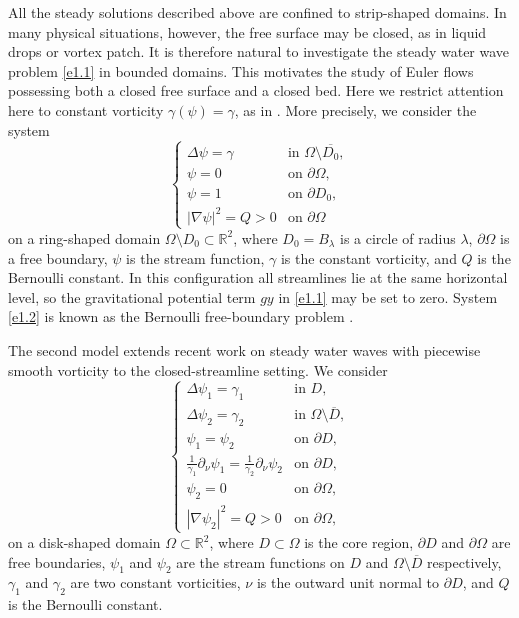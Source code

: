 \documentclass[reqno]{amsart}
\numberwithin{equation}{section}
\numberwithin{equation}{section}
\numberwithin{equation}{section}
\begin{document}
All the steady solutions described above are confined to strip-shaped domains. In many physical situations, however, the free surface may be closed, as in liquid drops or vortex patch. It is therefore natural to investigate the steady water wave problem \eqref{e1.1} in bounded domains. This motivates the study of Euler flows possessing both a closed free surface and a closed bed. Here we restrict attention here to constant vorticity \(\gamma(\psi) = \gamma\), as in \cite{ConstantinSV,ConstantinV}. More precisely, we consider the system
\begin{equation}
\label{e1.2}
\begin{cases}
\Delta \psi = \gamma & \text{in } \Omega \setminus \overline{D_0}, \\
\psi = 0 & \text{on } \partial \Omega, \\
\psi = 1 & \text{on } \partial D_0, \\
|\nabla \psi|^2 = Q > 0 & \text{on } \partial \Omega
\end{cases}
\end{equation}
on a ring-shaped domain \(\Omega \setminus D_0 \subset \mathbb{R}^2\), where \(D_0 = B_\lambda\) is a circle of radius \(\lambda\), \(\partial \Omega\) is a free boundary, \(\psi\) is the stream function, \(\gamma\) is the constant vorticity, and \(Q\) is the Bernoulli constant. In this configuration all streamlines lie at the same horizontal level, so the gravitational potential term \(gy\) in \eqref{e1.1} may be set to zero. System \eqref{e1.2} is known as the Bernoulli free-boundary problem \cite[(1.1)]{HenrotO}.

The second model extends recent work \cite{GuiWYZ} on steady water waves with piecewise smooth vorticity to the closed-streamline setting. We consider
\begin{equation}\label{e1.3}
\begin{cases}
\Delta \psi_1 = \gamma_1 & \text{in } D, \\
\Delta \psi_2 = \gamma_2 & \text{in } \Omega \setminus \overline{D}, \\
\psi_1 = \psi_2 & \text{on } \partial D, \\
\frac{1}{\gamma_1} \partial_\nu \psi_1 = \frac{1}{\gamma_2} \partial_\nu \psi_2 & \text{on } \partial D, \\
\psi_2 = 0 & \text{on } \partial \Omega, \\
|\nabla \psi_2|^2 = Q > 0 & \text{on } \partial \Omega,
\end{cases}
\end{equation}
on a disk-shaped domain \(\Omega \subset \mathbb{R}^2\), where \(D \subset \Omega\) is the core region, \(\partial D\) and \(\partial \Omega\) are free boundaries, \(\psi_1\) and \(\psi_2\) are the stream functions on \(D\) and \(\Omega \setminus \overline{D}\) respectively, \(\gamma_1\) and \(\gamma_2\) are two constant vorticities, \(\nu\) is the outward unit normal to \(\partial D\), and \(Q\) is the Bernoulli constant.
\end{document}

